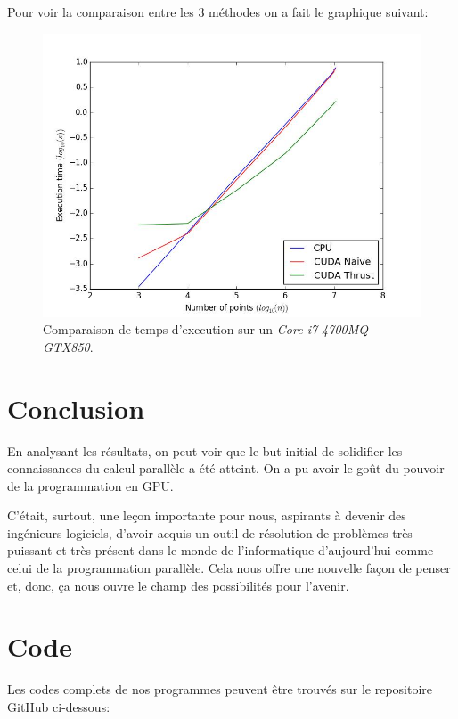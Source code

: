 \documentclass[12pt,oneside]{article}
\begin{document}
Pour voir la comparaison entre les 3 méthodes on a fait le graphique suivant:

\begin{figure}[h]
\centering
\includegraphics[width=1.0\textwidth]{../figures/comparison.jpg}
\caption{\label{fig:Comparaison}Comparaison de temps d'execution sur un \emph{Core i7 4700MQ - GTX850}.}
\end{figure}


\section{Conclusion}

En analysant les résultats, on peut voir que le but initial de solidifier les connaissances du calcul parallèle a été atteint. On a pu avoir le goût du pouvoir de la programmation en GPU.

C'était, surtout, une leçon importante pour nous, aspirants à devenir des ingénieurs logiciels, d'avoir acquis un outil de résolution de problèmes très puissant et très présent dans le monde de l'informatique d'aujourd'hui comme celui de la programmation parallèle. Cela nous offre une nouvelle façon de penser et, donc, ça nous ouvre le champ des possibilités pour l'avenir.

\section{Code}

Les codes complets de nos programmes peuvent être trouvés sur le repositoire GitHub ci-dessous:
  
\end{document}
